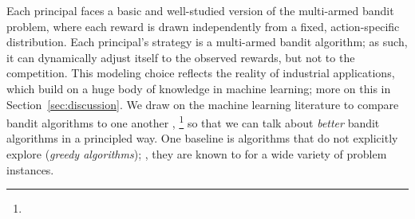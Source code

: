 
Each principal faces a basic and well-studied version of the multi-armed bandit problem, where each reward is drawn independently from a fixed, action-specific distribution. Each principal's strategy is a multi-armed bandit algorithm; as such, it can dynamically adjust itself to the observed rewards, but not to the competition. This modeling choice reflects the reality of industrial applications, which build on a huge body of knowledge in machine learning; more on this in Section~\ref{sec:discussion}.
We draw on the machine learning literature to compare bandit algorithms to one another ,%
\footnote{}
 so that we can talk about \emph{better} bandit algorithms in a principled way.
One baseline is algorithms that do not explicitly explore (\emph{greedy algorithms}); , they are known to  for a wide variety of problem instances.




